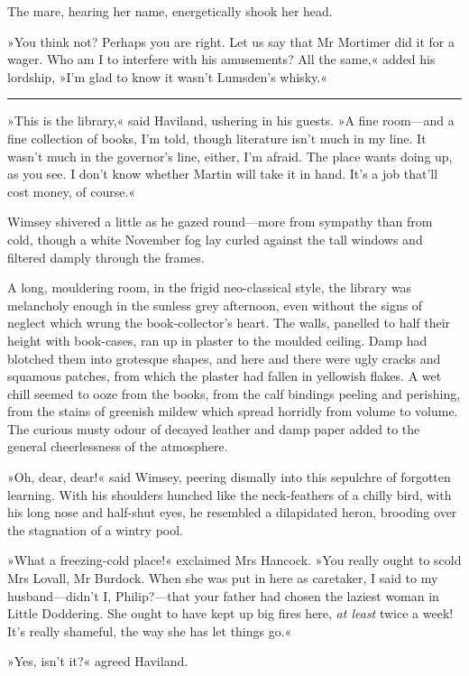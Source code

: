 The mare, hearing her name, energetically shook her head.

»You think not? Perhaps you are right. Let us say that Mr Mortimer did it for a wager. Who am I to interfere with his amusements? All the same,« added his lordship, »I'm glad to know it wasn't Lumsden's whisky.«

\noindent\hfil\rule{0.5\textwidth}{.4pt}\hfil 

»This is the library,« said Haviland, ushering in his guests. »A fine room—and a fine collection of books, I'm told, though literature isn't much in my line. It wasn't much in the governor's line, either, I'm afraid. The place wants doing up, as you see. I don't know whether Martin will take it in hand. It's a job that'll cost money, of course.«

Wimsey shivered a little as he gazed round—more from sympathy than from cold, though a white November fog lay curled against the tall windows and filtered damply through the frames.

A long, mouldering room, in the frigid neo-classical style, the library was melancholy enough in the sunless grey afternoon, even without the signs of neglect which wrung the book-collector's heart. The walls, panelled to half their height with book-cases, ran up in plaster to the moulded ceiling. Damp had blotched them into grotesque shapes, and here and there were ugly cracks and squamous patches, from which the plaster had fallen in yellowish flakes. A wet chill seemed to ooze from the books, from the calf bindings peeling and perishing, from the stains of greenish mildew which spread horridly from volume to volume. The curious musty odour of decayed leather and damp paper added to the general cheerlessness of the atmosphere.

»Oh, dear, dear!« said Wimsey, peering dismally into this sepulchre of forgotten learning. With his shoulders hunched like the neck-feathers of a chilly bird, with his long nose and half-shut eyes, he resembled a dilapidated heron, brooding over the stagnation of a wintry pool.

»What a freezing-cold place!« exclaimed Mrs Hancock. »You really ought to scold Mrs Lovall, Mr Burdock. When she was put in here as caretaker, I said to my husband—didn't I, Philip?—that your father had chosen the laziest woman in Little Doddering. She ought to have kept up big fires here, \textit{at least} twice a week! It's really shameful, the way she has let things go.«

»Yes, isn't it?« agreed Haviland.

